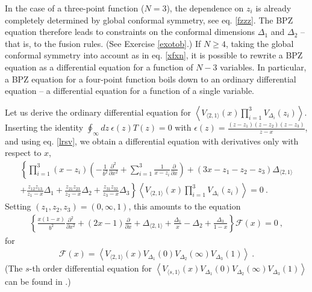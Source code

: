 \documentclass[12pt, a4paper, notitlepage, twoside]{report}
\numberwithin{equation}{section}
\theoremstyle{break}
\begin{document}
In the case of a three-point function ($N=3$), the dependence on $z_i$ is already completely determined by global conformal symmetry, see eq. \eqref{fzzz}.
The BPZ equation therefore leads to constraints on the conformal dimensions $\Delta_1$ and $\Delta_2$ -- that is, to the fusion rules. (See Exercise \ref{exotob}.) If $N\geq 4$, taking the global conformal symmetry into account as in eq. \eqref{xfxn}, it is possible to rewrite a BPZ equation as a differential equation for a function of $N-3$ variables.
In particular, a BPZ equation for a four-point function boils down to an ordinary differential equation -- a differential equation for a function of a single variable.  

Let us derive the ordinary differential equation for $\left\langle V_{\langle 2,1 \rangle}(x)\prod_{i=1}^3 V_{\Delta_i}(z_i)\right\rangle$.
Inserting the identity $\oint_\infty dz\ \epsilon(z) T(z) =0$ with $\epsilon(z) = \frac{(z-z_1)(z-z_2)(z-z_3)}{z-x}$, and using eq. \eqref{lrsv}, we obtain a differential equation with derivatives only with respect to $x$, 
\begin{multline}
  \left\{ \prod_{i=1}^3(x-z_i)\left(-\frac{1}{b^2}\frac{\partial^2}{\partial x^2} +\sum_{i=1}^3 \frac{1}{x-z_i} {\frac{\partial}{\partial x}} \right) + (3x-z_1-z_2-z_3)\Delta_{\langle 2,1 \rangle} \right.
  \\
\left.  +\frac{z_{12}z_{13}}{z_1-x}\Delta_1 + \frac{z_{21}z_{23}}{z_2-x}\Delta_2+\frac{z_{31}z_{32}}{z_3-x}\Delta_3\right\} 
\left\langle V_{\langle 2,1 \rangle}(x)\prod_{i=1}^3 V_{\Delta_i}(z_i)\right\rangle  = 0\ . 
\end{multline}
Setting $(z_1,z_2,z_3)=(0,\infty,1)$, this amounts to the equation 
\begin{align}
  \left\{ \frac{x(1-x)}{b^2}\frac{\partial^2}{\partial x^2} + (2x-1){\frac{\partial}{\partial x}} +\Delta_{\langle 2,1 \rangle} +\frac{\Delta_1}{x}-\Delta_2 + \frac{\Delta_3}{1-x}\right\} \mathcal{F}(x)=0\ ,
\label{sode}
\end{align}
for 
\begin{align}
 \mathcal{F}(x) = \left\langle V_{\langle 2,1 \rangle}(x)V_{\Delta_1}(0)V_{\Delta_2}(\infty)V_{\Delta_3}(1)\right\rangle\ .
\label{fxv}
 \end{align}
(The $s$-th order differential equation for $\left\langle V_{\langle s,1 \rangle}(x)V_{\Delta_1}(0)V_{\Delta_2}(\infty)V_{\Delta_3}(1)\right\rangle $ can be found in \cite{flno09}.)
\end{document}
